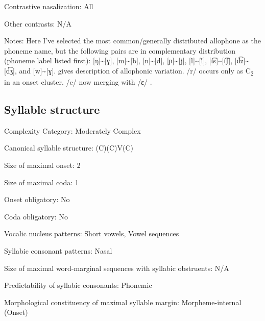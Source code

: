 {\begin{appendixdesc}
\item[Contrastive nasalization:] All

\item[Other contrasts:] N/A

\item[Notes:] Here I’ve selected the most common/generally distributed allophone as the phoneme name, but the following pairs are in complementary distribution (phoneme label listed first): [ŋ]{\textasciitilde}[ɣ], [m]{\textasciitilde}[b], [n]{\textasciitilde}[d], [ɲ]{\textasciitilde}[j], [l]{\textasciitilde}[\~{l}], [t͡s]{\textasciitilde}[t͡ʃ], [d͡z]{\textasciitilde}[d͡ʒ], and [w]{\textasciitilde}[ɣ]. \citet[10--18]{Duthie1996} gives description of allophonic variation. /r/ occurs only as C\textsubscript{2} in an onset cluster. /e/ now merging with /ɛ/ \citep[19]{Duthie1996}.
\end{appendixdesc}
\subsection*{Syllable structure}
\begin{appendixdesc}

\item[Complexity Category:] Moderately Complex

\item[Canonical syllable structure:] (C)(C)V(C) \citep[38--39]{Ameka1991}

\item[Size of maximal onset:] 2

\item[Size of maximal coda:] 1

\item[Onset obligatory:] No

\item[Coda obligatory:] No

\item[Vocalic nucleus patterns:] Short vowels, Vowel sequences

\item[Syllabic consonant patterns:] Nasal

\item[Size of maximal word-marginal sequences with syllabic obstruents:] N/A

\item[Predictability of syllabic consonants:] Phonemic

\item[Morphological constituency of maximal syllable margin:] Morpheme-internal (Onset)


\end{appendixdesc}}
